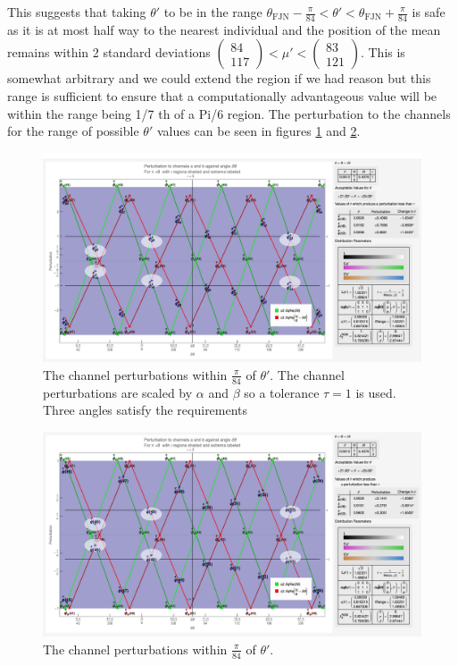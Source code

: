 This suggests that taking $\theta'$ to be in the range $\theta _{\text{FJN}} -\frac{\pi}{84} < \theta' < \theta _{\text{FJN}} +\frac{\pi}{84}$ is safe as it is at most half way to the nearest individual and the position of the mean remains within 2 standard deviations 
$\left(\begin{array}{c} 84 \\ 117 \end{array} \right) < \mu'  < \left(\begin{array}{c} 83 \\ 121 \end{array} \right) $. This is somewhat arbitrary and we could extend the region if we had reason but this range is sufficient to ensure that a computationally advantageous value will be within the range being 1/7 th of a Pi/6 region.  The perturbation to the channels for the range of possible $\theta'$ values can be seen in figures \ref{fig:PerturbationNearThetaAB} and \ref{fig:PerturbationNearThetaT}.


\begin{figure}[h!]
  \centering
  \includegraphics[width=1.0 \textwidth]{Chapter3/Figs/Channel_Perturbations_Angle_Decision_AB.jpg} 
    \caption{The channel perturbations within $\frac{\pi}{84}$ of $\theta'$. The channel perturbations are scaled by $\alpha$ and $\beta$ so a tolerance $\tau=1$ is used. Three angles satisfy the requirements}  \label{fig:PerturbationNearThetaAB}
\end{figure}

\begin{figure}[h!]
  \centering
  \includegraphics[width=1.0 \textwidth]{Chapter3/Figs/Channel_Perturbations_Angle_Decision_T.jpg} 
    \caption{The channel perturbations within $\frac{\pi}{84}$ of $\theta'$.}  \label{fig:PerturbationNearThetaT}
\end{figure}

